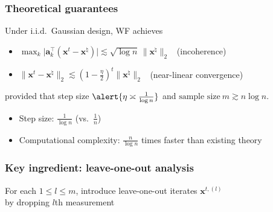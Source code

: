 \documentclass[compress,
mathserif,wide,%
]{beamer}
\newcommand{\yuxinRegFigs}{figure}
\begin{document}
\begin{frame}
	\frametitle{Theoretical guarantees}



\begin{theorem}
Under i.i.d.~Gaussian design, WF achieves 
\begin{itemize}
	\itemsep0.3em
	\item $  \max_k \big| \bm{a}_k^{\top} (\bm{x}^{t}- \bm{x}^{\natural} ) \big | \lesssim \sqrt{\log n} \, \| \bm{x}^{\natural} \|_2$ ~(incoherence)
	\pause
	\item 
$\|\bm{x}^{t}- \bm{x}^\natural\|_2 \lesssim \left(1-\frac{\eta}{2}\right)^{t}\|\bm{x}^\natural\|_{2}$ ~(near-linear convergence)
\end{itemize}
provided that step size $\alert{\eta \asymp \frac{1}{\log n}}$ and
$ \text{sample size}~ m \gtrsim n\log n $.
\end{theorem}



\vfill

\pause

\begin{itemize}
	\itemsep1em
	\item Step size: $\frac{1}{\log n}$ (vs.~$\frac{1}{n}$) 
	\pause
	\item Computational complexity:
	$\frac{n}{\log n}$ times faster than existing theory
\end{itemize}
\end{frame}





\begin{frame}
	\frametitle{Key ingredient: leave-one-out analysis}
For each $1\leq l\leq m$, introduce leave-one-out iterates $\bm{x}^{t,(l)}$ \\ by dropping $l$th measurement
\vfill
{}

\end{frame}
\end{document}
